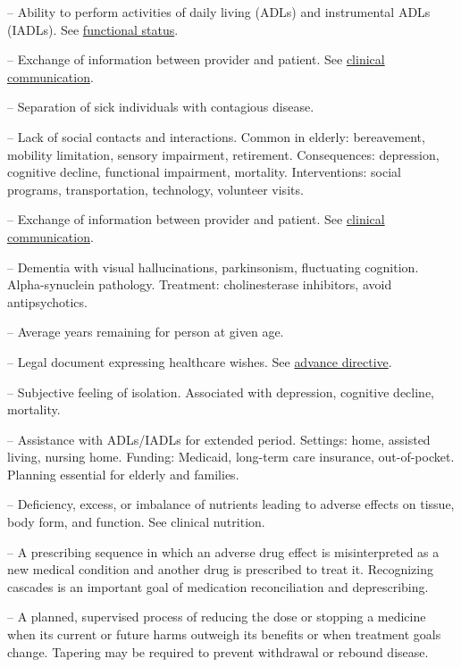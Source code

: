 -- Ability to perform activities of daily living (ADLs) and instrumental ADLs (IADLs). See \hyperlink{Functional Status}{functional status}.

-- Exchange of information between provider and patient. See \hyperlink{Clinical Communication}{clinical communication}.

-- Separation of sick individuals with contagious disease.

-- Lack of social contacts and interactions. Common in elderly: bereavement, mobility limitation, sensory impairment, retirement. Consequences: depression, cognitive decline, functional impairment, mortality. Interventions: social programs, transportation, technology, volunteer visits.

-- Exchange of information between provider and patient. See \hyperlink{Clinical Communication}{clinical communication}.

-- Dementia with visual hallucinations, parkinsonism, fluctuating cognition. Alpha-synuclein pathology. Treatment: cholinesterase inhibitors, avoid antipsychotics.

-- Average years remaining for person at given age.

-- Legal document expressing healthcare wishes. See \hyperlink{Advance Directive}{advance directive}.

-- Subjective feeling of isolation. Associated with depression, cognitive decline, mortality.

-- Assistance with ADLs/IADLs for extended period. Settings: home, assisted living, nursing home. Funding: Medicaid, long-term care insurance, out-of-pocket. Planning essential for elderly and families.

-- Deficiency, excess, or imbalance of nutrients leading to adverse effects on tissue, body form, and function. See clinical nutrition.

-- A prescribing sequence in which an adverse drug effect is misinterpreted as a new medical condition and another drug is prescribed to treat it. Recognizing cascades is an important goal of medication reconciliation and deprescribing.

-- A planned, supervised process of reducing the dose or stopping a medicine when its current or future harms outweigh its benefits or when treatment goals change. Tapering may be required to prevent withdrawal or rebound disease.

